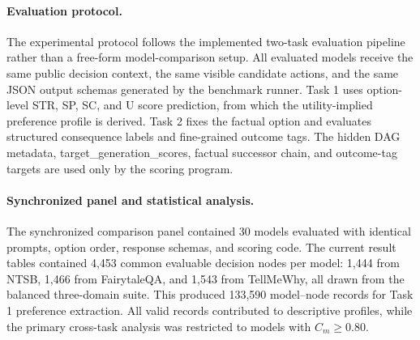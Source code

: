 \documentclass[pdflatex,sn-mathphys-num]{sn-jnl}%
\theoremstyle{thmstyleone}%
\theoremstyle{thmstyletwo}%
\theoremstyle{thmstylethree}%
\begin{document}
\paragraph{Evaluation protocol.}
The experimental protocol follows the implemented two-task evaluation pipeline rather than a free-form model-comparison setup. All evaluated models receive the same public decision context, the same visible candidate actions, and the same JSON output schemas generated by the benchmark runner. Task 1 uses option-level STR, SP, SC, and U score prediction, from which the utility-implied preference profile is derived. Task 2 fixes the factual option and evaluates structured consequence labels and fine-grained outcome tags. The hidden DAG metadata, target\_generation\_scores, factual successor chain, and outcome-tag targets are used only by the scoring program.

\paragraph{Synchronized panel and statistical analysis.}
The synchronized comparison panel contained 30 models evaluated with identical prompts, option order, response schemas, and scoring code. The current result tables contained 4,453 common evaluable decision nodes per model: 1,444 from NTSB, 1,466 from FairytaleQA, and 1,543 from TellMeWhy, all drawn from the balanced three-domain suite. This produced 133,590 model--node records for Task 1 preference extraction. All valid records contributed to descriptive profiles, while the primary cross-task analysis was restricted to models with $C_m\geq0.80$.
\end{document}
